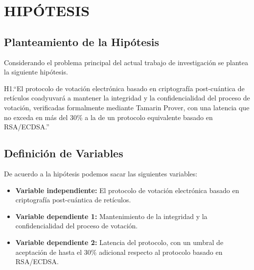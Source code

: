 \section{HIPÓTESIS}

\subsection{Planteamiento de la Hipótesis}
Considerando el problema principal del actual trabajo de investigación se plantea la siguiente hipótesis.

H1.``El protocolo de votación electrónica basado en criptografía post-cuántica de retículos coadyuvará a mantener la integridad y la confidencialidad del proceso de votación, verificadas formalmente mediante Tamarin Prover, con una latencia que no exceda en más del 30\% a la de un protocolo equivalente basado en RSA/ECDSA.''



\subsection{Definición de Variables}
De acuerdo a la hipótesis podemos sacar las siguientes variables:

\begin{itemize}
	\item \textbf{Variable independiente:} El protocolo de votación electrónica basado en criptografía post-cuántica de retículos.
	\item \textbf{Variable dependiente 1:} Mantenimiento de la integridad y la confidencialidad del proceso de votación.
	\item \textbf{Variable dependiente 2:} Latencia del protocolo, con un umbral de aceptación de hasta el 30\% adicional respecto al protocolo basado en RSA/ECDSA.
\end{itemize}

\newpage
